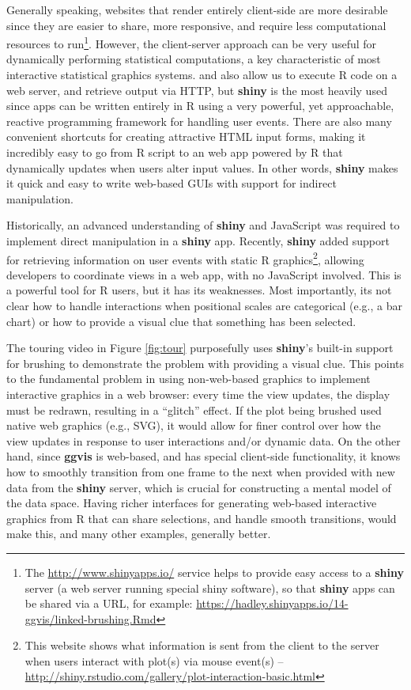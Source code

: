 \documentclass[11pt]{isuthesis}
\begin{document}
Generally speaking, websites that render entirely client-side are more
desirable since they are easier to share, more responsive, and require
less computational resources to run\footnote{The
  \url{http://www.shinyapps.io/} service helps to provide easy access to
  a \textbf{shiny} server (a web server running special shiny software),
  so that \textbf{shiny} apps can be shared via a URL, for example:
  \url{https://hadley.shinyapps.io/14-ggvis/linked-brushing.Rmd}}.
However, the client-server approach can be very useful for dynamically
performing statistical computations, a key characteristic of most
interactive statistical graphics systems. \citep{FastRWeb} and
\citep{opencpu} also allow us to execute R code on a web server, and
retrieve output via HTTP, but \textbf{shiny} is the most heavily used
since apps can be written entirely in R using a very powerful, yet
approachable, reactive programming framework for handling user events.
There are also many convenient shortcuts for creating attractive HTML
input forms, making it incredibly easy to go from R script to an web app
powered by R that dynamically updates when users alter input values. In
other words, \textbf{shiny} makes it quick and easy to write web-based
GUIs with support for indirect manipulation.

Historically, an advanced understanding of \textbf{shiny} and JavaScript
was required to implement direct manipulation in a \textbf{shiny} app.
Recently, \textbf{shiny} added support for retrieving information on
user events with static R graphics\footnote{This website shows what
  information is sent from the client to the server when users interact
  with plot(s) via mouse event(s) --
  \url{http://shiny.rstudio.com/gallery/plot-interaction-basic.html}},
allowing developers to coordinate views in a web app, with no JavaScript
involved. This is a powerful tool for R users, but it has its
weaknesses. Most importantly, its not clear how to handle interactions
when positional scales are categorical (e.g., a bar chart) or how to
provide a visual clue that something has been selected.

The touring video in Figure \ref{fig:tour} purposefully uses
\textbf{shiny}'s built-in support for brushing to demonstrate the
problem with providing a visual clue. This points to the fundamental
problem in using non-web-based graphics to implement interactive
graphics in a web browser: every time the view updates, the display must
be redrawn, resulting in a ``glitch'' effect. If the plot being brushed
used native web graphics (e.g., SVG), it would allow for finer control
over how the view updates in response to user interactions and/or
dynamic data. On the other hand, since \textbf{ggvis} is web-based, and
has special client-side functionality, it knows how to smoothly
transition from one frame to the next when provided with new data from
the \textbf{shiny} server, which is crucial for constructing a mental
model of the data space. Having richer interfaces for generating
web-based interactive graphics from R that can share selections, and
handle smooth transitions, would make this, and many other examples,
generally better.
\end{document}
